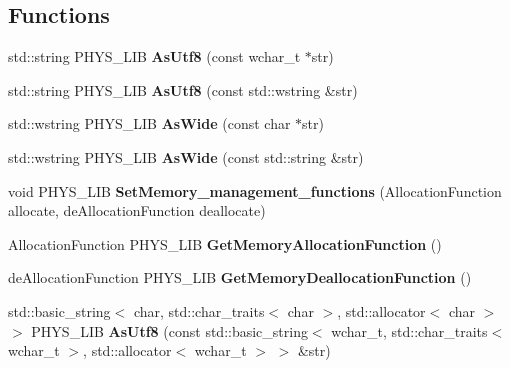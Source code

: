 \subsection*{Functions}
\begin{DoxyCompactItemize}
\item 
\hypertarget{namespacephys_1_1xml_a3adcb83b952ab6a714da13d20ab189d7}{
std::string PHYS\_\-LIB {\bfseries AsUtf8} (const wchar\_\-t $\ast$str)}
\label{d9/d27/namespacephys_1_1xml_a3adcb83b952ab6a714da13d20ab189d7}

\item 
\hypertarget{namespacephys_1_1xml_aed8d86b7ea1735f88de53d7947740ddd}{
std::string PHYS\_\-LIB {\bfseries AsUtf8} (const std::wstring \&str)}
\label{d9/d27/namespacephys_1_1xml_aed8d86b7ea1735f88de53d7947740ddd}

\item 
\hypertarget{namespacephys_1_1xml_ac14c911adabeb58e973c36105b85abac}{
std::wstring PHYS\_\-LIB {\bfseries AsWide} (const char $\ast$str)}
\label{d9/d27/namespacephys_1_1xml_ac14c911adabeb58e973c36105b85abac}

\item 
\hypertarget{namespacephys_1_1xml_acf80dd12469021a66d48a325484ba9f1}{
std::wstring PHYS\_\-LIB {\bfseries AsWide} (const std::string \&str)}
\label{d9/d27/namespacephys_1_1xml_acf80dd12469021a66d48a325484ba9f1}

\item 
\hypertarget{namespacephys_1_1xml_a404bed92ebb56ab9b0fe7192cb365736}{
void PHYS\_\-LIB {\bfseries SetMemory\_\-management\_\-functions} (AllocationFunction allocate, deAllocationFunction deallocate)}
\label{d9/d27/namespacephys_1_1xml_a404bed92ebb56ab9b0fe7192cb365736}

\item 
\hypertarget{namespacephys_1_1xml_ac7c7807926da372d187c6560fa42c255}{
AllocationFunction PHYS\_\-LIB {\bfseries GetMemoryAllocationFunction} ()}
\label{d9/d27/namespacephys_1_1xml_ac7c7807926da372d187c6560fa42c255}

\item 
\hypertarget{namespacephys_1_1xml_afc978e9c1c6df7b57ce4d8bb7c3ba3e7}{
deAllocationFunction PHYS\_\-LIB {\bfseries GetMemoryDeallocationFunction} ()}
\label{d9/d27/namespacephys_1_1xml_afc978e9c1c6df7b57ce4d8bb7c3ba3e7}

\item 
\hypertarget{namespacephys_1_1xml_a8721da4a57634acd3a3eb754d898fb88}{
std::basic\_\-string$<$ char, std::char\_\-traits$<$ char $>$, std::allocator$<$ char $>$ $>$ PHYS\_\-LIB {\bfseries AsUtf8} (const std::basic\_\-string$<$ wchar\_\-t, std::char\_\-traits$<$ wchar\_\-t $>$, std::allocator$<$ wchar\_\-t $>$ $>$ \&str)}
\label{d9/d27/namespacephys_1_1xml_a8721da4a57634acd3a3eb754d898fb88}


\end{DoxyCompactItemize}
